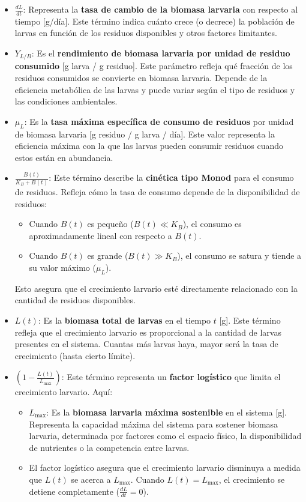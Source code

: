 \documentclass[12pt]{article}
\begin{document}
\begin{itemize}
    \item $\frac{dL}{dt}$: Representa la \textbf{tasa de cambio de la biomasa larvaria} con respecto al tiempo [g/día]. Este término indica cuánto crece (o decrece) la población de larvas en función de los residuos disponibles y otros factores limitantes.

    \item $Y_{L/B}$: Es el \textbf{rendimiento de biomasa larvaria por unidad de residuo consumido} [g larva / g residuo]. Este parámetro refleja qué fracción de los residuos consumidos se convierte en biomasa larvaria. Depende de la eficiencia metabólica de las larvas y puede variar según el tipo de residuos y las condiciones ambientales.

    \item $\mu_L$: Es la \textbf{tasa máxima específica de consumo de residuos} por unidad de biomasa larvaria [g residuo / g larva / día]. Este valor representa la eficiencia máxima con la que las larvas pueden consumir residuos cuando estos están en abundancia.

    \item $\frac{B(t)}{K_B + B(t)}$: Este término describe la \textbf{cinética tipo Monod} para el consumo de residuos. Refleja cómo la tasa de consumo depende de la disponibilidad de residuos:
    \begin{itemize}
        \item Cuando $B(t)$ es pequeño ($B(t) \ll K_B$), el consumo es aproximadamente lineal con respecto a $B(t)$.
        \item Cuando $B(t)$ es grande ($B(t) \gg K_B$), el consumo se satura y tiende a su valor máximo ($\mu_L$).
    \end{itemize}
    Esto asegura que el crecimiento larvario esté directamente relacionado con la cantidad de residuos disponibles.

    \item $L(t)$: Es la \textbf{biomasa total de larvas} en el tiempo $t$ [g]. Este término refleja que el crecimiento larvario es proporcional a la cantidad de larvas presentes en el sistema. Cuantas más larvas haya, mayor será la tasa de crecimiento (hasta cierto límite).

    \item $\left(1 - \frac{L(t)}{L_{\text{max}}}\right)$: Este término representa un \textbf{factor logístico} que limita el crecimiento larvario. Aquí:
    \begin{itemize}
        \item $L_{\text{max}}$: Es la \textbf{biomasa larvaria máxima sostenible} en el sistema [g]. Representa la capacidad máxima del sistema para sostener biomasa larvaria, determinada por factores como el espacio físico, la disponibilidad de nutrientes o la competencia entre larvas.
        \item El factor logístico asegura que el crecimiento larvario disminuya a medida que $L(t)$ se acerca a $L_{\text{max}}$. Cuando $L(t) = L_{\text{max}}$, el crecimiento se detiene completamente ($\frac{dL}{dt} = 0$).
    \end{itemize}


\end{itemize}
\end{document}
